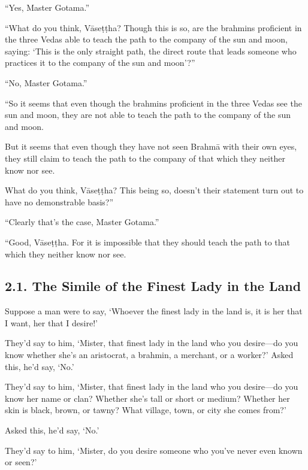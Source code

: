\documentclass[12pt,openany]{book}%
\begin{document}
“Yes, Master Gotama.” 

“What do you think, \textsanskrit{Vāseṭṭha}? Though this is so, are the brahmins proficient in the three Vedas able to teach the path to the company of the sun and moon, saying: ‘This is the only straight path, the direct route that leads someone who practices it to the company of the sun and moon’?” 

“No, Master Gotama.” 

“So it seems that even though the brahmins proficient in the three Vedas see the sun and moon, they are not able to teach the path to the company of the sun and moon. 

But it seems that even though they have not seen \textsanskrit{Brahmā} with their own eyes, they still claim to teach the path to the company of that which they neither know nor see. 

What do you think, \textsanskrit{Vāseṭṭha}? This being so, doesn’t their statement turn out to have no demonstrable basis?” 

“Clearly that’s the case, Master Gotama.” 

“Good, \textsanskrit{Vāseṭṭha}. For it is impossible that they should teach the path to that which they neither know nor see. 

\subsection*{2.1. The Simile of the Finest Lady in the Land }

Suppose a man were to say, ‘Whoever the finest lady in the land is, it is her that I want, her that I desire!’ 

They’d say to him, ‘Mister, that finest lady in the land who you desire—do you know whether she’s an aristocrat, a brahmin, a merchant, or a worker?’ Asked this, he’d say, ‘No.’ 

They’d say to him, ‘Mister, that finest lady in the land who you desire—do you know her name or clan? Whether she’s tall or short or medium? Whether her skin is black, brown, or tawny? What village, town, or city she comes from?’ 

Asked this, he’d say, ‘No.’ 

They’d say to him, ‘Mister, do you desire someone who you’ve never even known or seen?’ 
\end{document}
